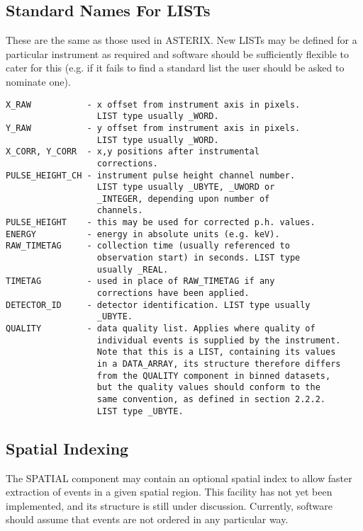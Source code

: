 \subsection{Standard Names For LISTs}

These are the same as those used in ASTERIX.  New LISTs may be defined
for  a  particular  instrument  as  required  and  software  should be
sufficiently flexible to cater for this (e.g.  if it fails to  find  a
standard list the user should be asked to nominate one).

\begin{verbatim}
X_RAW           - x offset from instrument axis in pixels.
                  LIST type usually _WORD. 
Y_RAW           - y offset from instrument axis in pixels.
                  LIST type usually _WORD. 
X_CORR, Y_CORR  - x,y positions after instrumental
                  corrections. 
PULSE_HEIGHT_CH - instrument pulse height channel number.
                  LIST type usually _UBYTE, _UWORD or
                  _INTEGER, depending upon number of
                  channels. 
PULSE_HEIGHT    - this may be used for corrected p.h. values.
ENERGY          - energy in absolute units (e.g. keV). 
RAW_TIMETAG     - collection time (usually referenced to
                  observation start) in seconds. LIST type
                  usually _REAL. 
TIMETAG         - used in place of RAW_TIMETAG if any
                  corrections have been applied.
DETECTOR_ID     - detector identification. LIST type usually
                  _UBYTE. 
QUALITY         - data quality list. Applies where quality of 
                  individual events is supplied by the instrument. 
                  Note that this is a LIST, containing its values 
                  in a DATA_ARRAY, its structure therefore differs
                  from the QUALITY component in binned datasets,
                  but the quality values should conform to the
                  same convention, as defined in section 2.2.2.
                  LIST type _UBYTE.
\end{verbatim}

\subsection{Spatial Indexing}

The SPATIAL component may contain an optional spatial index  to  allow
faster  extraction of events in a given spatial region.  This facility
has not yet  been  implemented,  and  its  structure  is  still  under
discussion.   Currently,  software  should  assume that events are not
ordered in any particular way.


